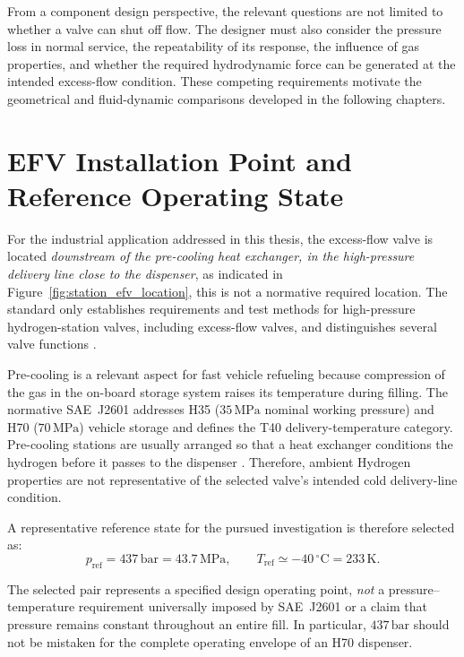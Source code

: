 From a component design perspective, the relevant questions are not limited to whether a valve can shut off flow. The designer must also consider the pressure loss in normal service, the repeatability of its response, the influence of gas properties, and whether the required hydrodynamic force can be generated at the intended excess-flow condition. These competing requirements motivate the geometrical and fluid-dynamic comparisons developed in the following chapters.

\section{EFV Installation Point and Reference Operating State}
\label{sec:efv_reference_state}

For the industrial application addressed in this thesis, the excess-flow valve is located \emph{downstream of the pre-cooling heat exchanger, in the high-pressure delivery line close to the dispenser}, as indicated in Figure~\ref{fig:station_efv_location}, this is not a normative required location. The standard only establishes requirements and test methods for high-pressure hydrogen-station valves, including excess-flow valves, and distinguishes several valve functions \cite{iso19880_3}.

Pre-cooling is a relevant aspect for fast vehicle refueling because compression of the gas in the on-board storage system raises its temperature during filling. The normative SAE~J2601 addresses H35 ($35\,\mathrm{MPa}$ nominal working pressure) and H70 ($70\,\mathrm{MPa}$) vehicle storage and defines the T40 delivery-temperature category. Pre-cooling stations are usually arranged so that a heat exchanger conditions the hydrogen before it passes to the dispenser \cite{sae_j2601,elgowainy2017,iso19880_1}. Therefore, ambient Hydrogen properties are not representative of the selected valve's intended cold delivery-line condition.

A representative reference state for the pursued investigation is therefore selected as:
\begin{equation}
  p_{\mathrm{ref}}=437\,\mathrm{bar}=43.7\,\mathrm{MPa},
  \qquad
  T_{\mathrm{ref}}\simeq-40\,^{\circ}\mathrm{C}=233\,\mathrm{K}.
  \label{eq:efv_reference_state}
\end{equation}

The selected pair represents a specified design operating point, \emph{not} a pressure--temperature requirement universally imposed by SAE~J2601 or a claim that pressure remains constant throughout an entire fill. In particular, $437\,\mathrm{bar}$ should not be mistaken for the complete operating envelope of an H70 dispenser.

